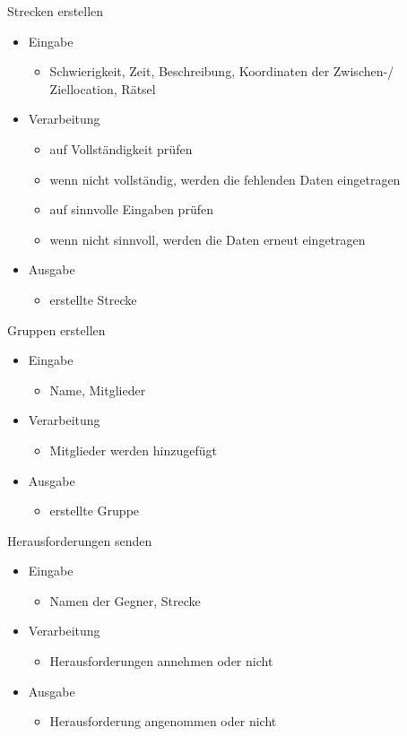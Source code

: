 \documentclass[a4paper, 12pt]{article}
\begin{document}
\bigskip
{\Large Strecken erstellen}\\
\begin{itemize}
\item Eingabe
	\begin{itemize}
	\item Schwierigkeit, Zeit, Beschreibung, Koordinaten der Zwischen-/ 						Ziellocation, Rätsel
	\end{itemize}
\item Verarbeitung
	\begin{itemize}
	\item auf Vollständigkeit prüfen
	\item wenn nicht vollständig, werden die fehlenden Daten eingetragen
	\item auf sinnvolle Eingaben prüfen
	\item wenn nicht sinnvoll, werden die Daten erneut eingetragen
	\end{itemize}
\item Ausgabe
	\begin{itemize}
	\item erstellte Strecke
	\end{itemize}
\end{itemize}

\bigskip
{\Large Gruppen erstellen}\\
\begin{itemize}
\item Eingabe
	\begin{itemize}
	\item Name, Mitglieder
	\end{itemize}
\item Verarbeitung
	\begin{itemize}
	\item Mitglieder werden hinzugefügt
	\end{itemize}
\item Ausgabe
	\begin{itemize}
	\item erstellte Gruppe
	\end{itemize}
\end{itemize}

\bigskip
{\Large Herausforderungen senden}\\
\begin{itemize}
\item Eingabe
	\begin{itemize}
	\item Namen der Gegner, Strecke
	\end{itemize}
\item Verarbeitung
	\begin{itemize}
	\item Herausforderungen annehmen oder nicht
	\end{itemize}
\item Ausgabe
	\begin{itemize}
	\item Herausforderung angenommen oder nicht
	\end{itemize}
\end{itemize}
\end{document}
